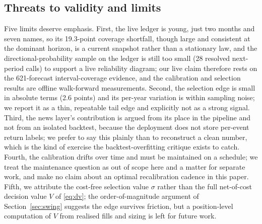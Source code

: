 \documentclass[10pt, a4paper, oneside]{article}
\theoremstyle{definition}
\theoremstyle{plain}
\begin{document}
\subsection{Threats to validity and limits}
Five limits deserve emphasis. First, the live ledger is young, just two months and seven
names, so its 19.3-point coverage shortfall, though large and consistent at the
dominant horizon, is a current snapshot rather than a stationary law, and the
directional-probability sample on the ledger is still too small (28 resolved
next-period calls) to support a live reliability diagram; our live claim therefore
rests on the 621-forecast interval-coverage evidence, and the calibration and selection
results are offline walk-forward measurements. Second, the selection edge is small in
absolute terms (2.6 points) and its per-year variation is within sampling noise; we
report it as a thin, repeatable tail edge and explicitly not as a strong signal.
Third, the news layer's contribution is argued from its place in the pipeline and not
from an isolated backtest, because the deployment does not store per-event return
labels; we prefer to say this plainly than to reconstruct a clean number, which is the
kind of exercise the backtest-overfitting critique exists to catch. Fourth, the
calibration drifts over time and must be maintained on a schedule; we treat the
maintenance question as out of scope here and a matter for separate work, and make no
claim about an optimal recalibration cadence in this paper. Fifth, we attribute the
cost-free selection value $\sigma$ rather than the full net-of-cost decision value $V$
of \eqref{eq:dv}; the order-of-magnitude argument of Section~\ref{sec:swing} suggests
the edge survives friction, but a position-level computation of $V$ from realised fills
and sizing is left for future work.
\end{document}
